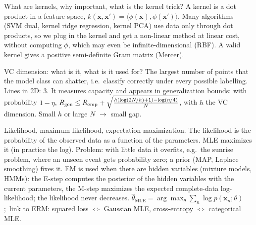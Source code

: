 \begin{qabox}[Kofler]{\asked What are kernels, why important, what is the kernel trick?}
\ans A kernel is a dot product in a feature space, $k(\mathbf{x},\mathbf{x}')=\langle\phi(\mathbf{x}),\phi(\mathbf{x}')\rangle$.
Many algorithms (SVM dual, kernel ridge regression, kernel PCA) use data only through dot
products, so we plug in the kernel and get a non-linear method at linear cost, without computing
$\phi$, which may even be infinite-dimensional (RBF). A valid kernel gives a positive
semi-definite Gram matrix (Mercer).
\end{qabox}

\begin{qabox}[Kofler]{\asked VC dimension: what is it, what is it used for?}
\ans The largest number of points that the model class can shatter, i.e.\ classify correctly under
every possible labelling. Lines in 2D: 3. It measures capacity and appears in generalization
bounds: with probability $1-\eta$,
$R_{\mathrm{gen}}\le R_{\mathrm{emp}}+\sqrt{\frac{h(\log(2N/h)+1)-\log(\eta/4)}{N}}$, with $h$ the VC dimension.
Small $h$ or large $N$ $\to$ small gap.
\end{qabox}

\begin{qabox}{\asked Likelihood, maximum likelihood, expectation maximization.}
\ans The likelihood is the probability of the observed data as a function of the parameters. MLE
maximizes it (in practice the log). Problem: with little data it overfits, e.g.\ the sunrise
problem, where an unseen event gets probability zero; a prior (MAP, Laplace smoothing) fixes it.
EM is used when there are hidden variables (mixture models, HMMs): the E-step computes the
posterior of the hidden variables with the current parameters, the M-step maximizes the expected
complete-data log-likelihood; the likelihood never decreases.
\formula $\hat\theta_{\mathrm{MLE}}=\arg\max_\theta\sum_n\log p(\mathbf{x}_n;\theta)$;\
link to ERM: squared loss $\Leftrightarrow$ Gaussian MLE, cross-entropy $\Leftrightarrow$ categorical MLE.
\end{qabox}

